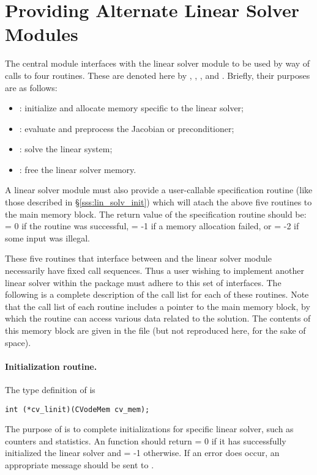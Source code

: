 \section{Providing Alternate Linear Solver Modules}\label{s:new_linsolv}
The central {\cvode} module interfaces with the linear solver module to be
used by way of calls to four routines.  These are denoted here by 
, , , and .
Briefly, their purposes are as follows:
\begin{itemize}
\item {}: initialize and allocate memory specific to the
linear solver;
\item {}: evaluate and preprocess the Jacobian or preconditioner;
\item {}: solve the linear system;
\item {}: free the linear solver memory.
\end{itemize}

A linear solver module must also provide a user-callable specification routine
(like those described in \S\ref{sss:lin_solv_init}) which will atach the above five 
routines to the main {\cvode} memory block. The return value of the specification 
routine should be:  = 0 if the routine was successful,
 = -1 if a memory allocation failed, or  = -2
if some input was illegal.

These five routines that interface between {\cvode} and the linear solver module
necessarily have fixed call sequences.  Thus a user wishing to implement another 
linear solver within the {\cvode} package must adhere to this set of interfaces.
The following is a complete description of the call list for each of
these routines.  Note that the call list of each routine includes a
pointer to the main {\cvode} memory block, by which the routine can access
various data related to the {\cvode} solution.  The contents of this memory
block are given in the file  (but not reproduced here, for
the sake of space).

\paragraph{Initialization routine.}
The type definition of  is
\begin{verbatim}
int (*cv_linit)(CVodeMem cv_mem);
\end{verbatim}
The purpose of  is to complete initializations for      
specific linear solver, such as counters and statistics.        
An  function should return  = 0 if it 
has successfully initialized the {\cvode} linear solver and 
 = -1 otherwise. 
If an error does occur, an appropriate message should be sent 
to .


